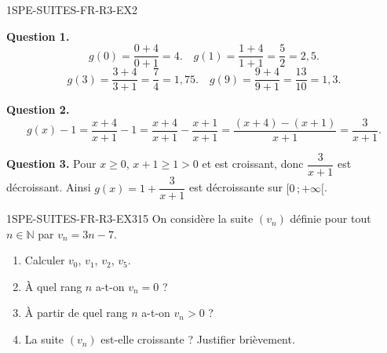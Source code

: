 
\begin{corrige}{1SPE-SUITES-FR-R3-EX2}

\textbf{Question 1.}
\[
g(0) = \frac{0+4}{0+1} = 4. \quad g(1) = \frac{1+4}{1+1} = \frac{5}{2} = 2{,}5.
\]
\[
g(3) = \frac{3+4}{3+1} = \frac{7}{4} = 1{,}75. \quad g(9) = \frac{9+4}{9+1} = \frac{13}{10} = 1{,}3.
\]


\textbf{Question 2.}
\[
g(x) - 1 = \frac{x+4}{x+1} - 1 = \frac{x+4}{x+1} - \frac{x+1}{x+1} = \frac{(x+4)-(x+1)}{x+1} = \frac{3}{x+1}.
\]

\commentaireMarge{Sur $[0\,;+\infty[$, quand $x$ augmente, $x+1$ augmente, donc $\frac{3}{x+1}$ diminue, donc $g(x) = 1 + \frac{3}{x+1}$ diminue.}

\textbf{Question 3.} Pour $x \geq 0$, $x+1 \geq 1 > 0$ et est croissant, donc $\dfrac{3}{x+1}$ est décroissant. Ainsi $g(x) = 1 + \dfrac{3}{x+1}$ est décroissante sur $[0\,;+\infty[$.

\end{corrige}


\begin{exercice}{1SPE-SUITES-FR-R3-EX3}{1}{5}
On considère la suite $(v_n)$ définie pour tout $n \in \mathbb{N}$ par $v_n = 3n - 7$.
\begin{enumerate}
  \item Calculer $v_0$, $v_1$, $v_2$, $v_5$.
  \item À quel rang $n$ a-t-on $v_n = 0$ ?
  \item À partir de quel rang $n$ a-t-on $v_n > 0$ ?
  \item La suite $(v_n)$ est-elle croissante ? Justifier brièvement.
\end{enumerate}
\end{exercice}


